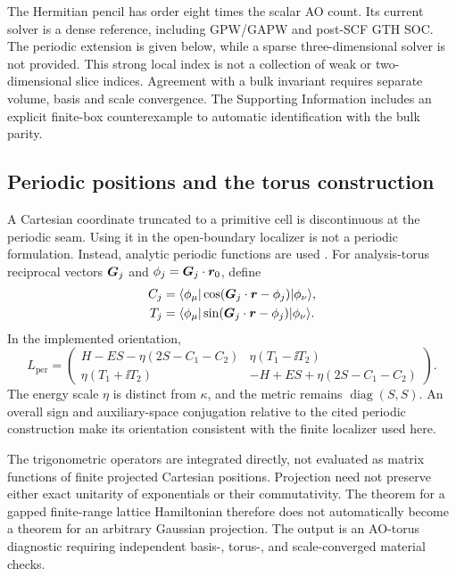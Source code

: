 The Hermitian pencil has order eight times the scalar AO count.
Its current solver is a dense reference, including
GPW/GAPW and post-SCF GTH SOC. The periodic extension is given
below, while a sparse three-dimensional solver is not provided.
This strong local index is
not a collection of weak or two-dimensional slice indices.
Agreement with a bulk invariant requires separate volume,
basis and scale convergence. The Supporting Information
includes an explicit finite-box counterexample to automatic
identification with the bulk parity.

\subsection{Periodic positions and the torus construction}
A Cartesian coordinate truncated to a primitive cell is discontinuous
at the periodic seam. Using it in the open-boundary localizer is not
a periodic formulation.
Instead, analytic periodic functions are used \cite{Doll2025}.
For analysis-torus reciprocal vectors $\bm{G}_j$ and
$\phi_j=\bm{G}_j\cdot\bm{r}_0$, define
\begin{equation}
 \begin{split}
 C_j&=\langle\phi_\mu|\cos(\bm{G}_j\cdot\bm{r}-\phi_j)|\phi_\nu\rangle,\\
 T_j&=\langle\phi_\mu|\sin(\bm{G}_j\cdot\bm{r}-\phi_j)|\phi_\nu\rangle .
 \end{split}
\end{equation}
In the implemented orientation,
\begin{equation}
 L_{\mathrm{per}}=
 \begin{pmatrix}
 H-ES-\eta(2S-C_1-C_2)&\eta(T_1-\ii T_2)\\
 \eta(T_1+\ii T_2)&-H+ES+\eta(2S-C_1-C_2)
 \end{pmatrix}.
 \label{eq:periodic-localizer}
\end{equation}
The energy scale $\eta$ is distinct from $\kappa$, and the metric
remains $\operatorname{diag}(S,S)$.
An overall sign and auxiliary-space conjugation relative to the
cited periodic construction make its orientation consistent with
the finite localizer used here.

The trigonometric operators are integrated directly, not evaluated
as matrix functions of finite projected Cartesian positions.
Projection need not preserve either exact unitarity of exponentials
or their commutativity. The theorem for a gapped finite-range lattice
Hamiltonian therefore does not automatically become a theorem for
an arbitrary Gaussian projection.
The output is an AO-torus diagnostic requiring independent
basis-, torus-, and scale-converged material checks.

